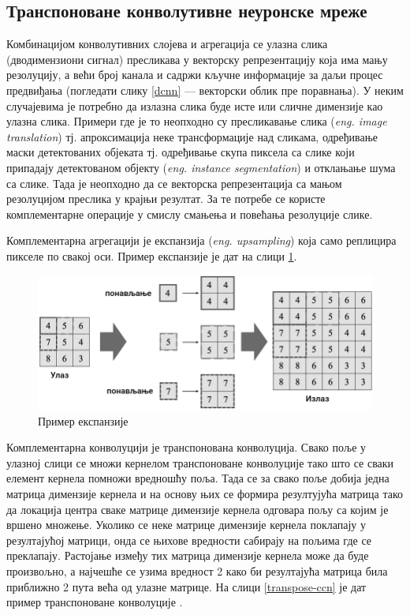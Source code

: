 \documentclass[11pt,oneside]{memoir}
\begin{document}

\subsection{Транспоноване конволутивне неуронске мреже}

Комбинацијом конволутивних слојева и агрегација се улазна слика (дводимензиони сигнал) пресликава у векторску репрезентацију која има мању резолуцију, 
а већи број канала и садржи кључне информације за даљи процес предвиђања (погледати слику \ref{dcnn} --- векторски облик пре поравнања). 
У неким случајевима је потребно да излазна слика буде 
исте или сличне димензије као улазна слика. Примери где је то неопходно су пресликавање слика (\textit{eng. image translation}) тј. апроксимација
неке трансформације над сликама, одређивање маски детектованих објеката тј. одређивање скупа пиксела са слике који припадају детектованом објекту
(\textit{eng. instance segmentation}) и отклањање шума са слике. Тада је неопходно да се
векторска репрезентација са мањом резолуцијом преслика у крајњи резултат. За те потребе се користе комплементарне операције у смислу
смањења и повећања резолуције слике. 

Комплементарна агрегацији је експанзија (\textit{eng. upsampling}) која само реплицира пикселе по свакој оси.
Пример експанзије је дат на слици \ref{upsampling}. 

\begin{figure}[H]
  \centering
  \includegraphics[width=1.0\textwidth]{images/upsampling.png}
  \caption{Пример експанзије \label{upsampling}}
\end{figure}

Комплементарна конволуцији је транспонована конволуција. Свако поље у улазној слици се множи кернелом транспоноване конволуције тако што
се сваки елемент кернела помножи вредношћу поља. Тада се за свако поље добија једна матрица димензије кернела и на основу њих се формира резултујућа
матрица тако да локација центра сваке матрице димензије кернела одговара пољу са којим је вршено множење. Уколико се неке матрице димензије кернела
поклапају у резултајућој матрици, онда се њихове вредности сабирају на пољима где се преклапају. Растојање између тих матрица димензије кернела
може да буде произвољно, а најчешће се узима вредност 2 како би резултајућа матрица била приближно 2 пута већа од улазне матрице.
На слици \ref{transpose-ccn} је дат пример транспоноване конволуције \cite{dive_into_deep_learning}.
\end{document}
